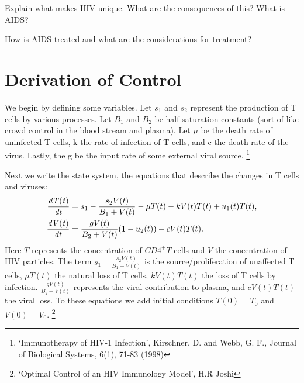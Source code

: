 % 

   
\begin{problem}
Explain what makes HIV unique. What are the consequences of this? What is AIDS?
\label{problem:hiv:virusunderstanding}
\end{problem}

\begin{problem}
How is AIDS treated and what are the considerations for treatment?
\label{problem:hiv:treatment}
\end{problem}

\section*{Derivation of Control}
We begin by defining some variables.
Let $s_1$ and $s_2$ represent the production of T cells by various processes.
Let $B_1$ and $B_2$ be half saturation constants (sort of like crowd control in the blood stream and plasma).
Let $\mu$ be the death rate of uninfected T cells, k the rate of infection of T cells, and c the death rate of the virus.
Lastly, the g be the input rate of some external viral source.
\footnote{`Immunotherapy of HIV-1 Infection', Kirschner, D. and Webb, G. F., Journal of Biological Systems, 6(1), 71-83 (1998)}

Next we write the state system, the equations that describe the changes in T cells and viruses:
\begin{align}
	\begin{split}
		\frac{\it{d}T(t)}{\it{dt}} &= s_1 - \frac{s_2V(t)}{B_1+V(t)} - \mu T(t)-kV(t)T(t)+u_1(t)T(t), \\
		\frac{\it{d}V(t)}{\it{dt}} &= \frac{gV(t)}{B_2+V(t)}(1-u_2(t)) - cV(t)T(t).
	\end{split} \label{original_state:HIV}
\end{align}
Here $T$ represents the concentration of $CD4^+T$ cells and $V$ the concentration of HIV particles. 
The term $s_1-\frac{s_2V(t)}{B_1+V(t)}$ is the source/proliferation of unaffected T cells,
$\mu T(t)$ the natural loss of T cells, $kV(t)T(t)$ the loss of T cells by infection. 
$\frac{gV(t)}{B_2+V(t)}$ represents the viral contribution to plasma, and $cV(t)T(t)$ the viral loss.
To these equations we add initial conditions $T(0)=T_0$ and $V(0)=V_0$.
\footnote{`Optimal Control of an HIV Immunology Model', H.R Joshi}

